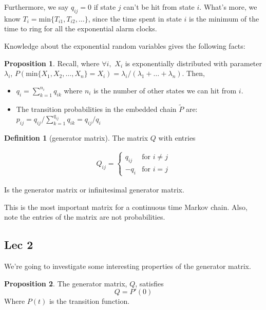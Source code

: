 \documentclass[12pt]{article}
\theoremstyle{definition}
\newtheorem{definition}{Definition}[section]
\newtheorem{proposition}{Proposition}[section]
\begin{document}
Furthermore, we say $q_{ij} = 0$ if state $j$ can't be hit from state $i$. What's more, we know $T_i = \text{min}\{T_{i1}, T_{i2}, \dots \}$, since the time spent in state $i$ is the minimum of the time to ring for all the exponential alarm clocks.

Knowledge about the exponential random variables gives the following facts:

\begin{proposition}
  Recall, where $\forall i,$ $X_i$ is exponentially distributed with parameter $\lambda_i$, $P(\text{min}\{X_1, X_2, \dots, X_n\} = X_i) = \lambda_i/(\lambda_1 + \dots + \lambda_n)$. Then,

  \begin{itemize}
    \item $q_i = \sum_{k=1}^{n_i}q_{ik}$ where $n_i$ is the number of other states we can hit from $i$.
    \item The transition probabilities in the embedded chain $\widetilde{P}$ are: $p_{ij} = q_{ij} / \sum_{k=1}^{q_{ij}}q_{ik} = q_{ij}/ q_i$
  \end{itemize}
\end{proposition}

\begin{definition}[generator matrix]
  The matrix $Q$ with entries

  \begin{align*}
    Q_{ij} = \begin{cases}
      q_{ij} & \text{for } i \ne j \\
      -q_i & \text{for } i =j
  \end{cases}
  \end{align*}

Is the generator matrix or infinitesimal generator matrix.

\end{definition}

This is the most important matrix for a continuous time Markov chain. Also, note the entries of the matrix are not probabilities.

\subsection{Lec 2}

We're going to investigate some interesting properties of the generator matrix.

\begin{proposition}
  The generator matrix, $Q$, satisfies
  $$
  Q = P'(0)
  $$
  Where $P(t)$ is the transition function.
\end{proposition}
\end{document}
